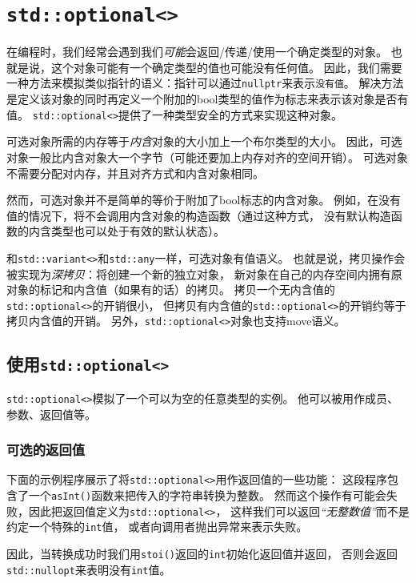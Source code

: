 \chapter{\texttt{std::optional<>}}\label{ch15}
在编程时，我们经常会遇到我们\emph{可能}会返回/传递/使用一个确定类型的对象。
也就是说，这个对象可能有一个确定类型的值也可能没有任何值。
因此，我们需要一种方法来模拟类似指针的语义：指针可以通过\texttt{nullptr}来表示\texttt{没有值}。
解决方法是定义该对象的同时再定义一个附加的bool类型的值作为标志来表示该对象是否有值。
\texttt{std::optional<>}提供了一种类型安全的方式来实现这种对象。

可选对象所需的内存等于\emph{内含}对象的大小加上一个布尔类型的大小。
因此，可选对象一般比内含对象大一个字节（可能还要加上内存对齐的空间开销）。
可选对象不需要分配对内存，并且对齐方式和内含对象相同。

然而，可选对象并不是简单的等价于附加了bool标志的内含对象。
例如，在没有值的情况下，将不会调用内含对象的构造函数（通过这种方式，
没有默认构造函数的内含类型也可以处于有效的默认状态）。

和\texttt{std::variant<>}和\texttt{std::any}一样，可选对象有值语义。
也就是说，拷贝操作会被实现为\emph{深拷贝}：将创建一个新的独立对象，
新对象在自己的内存空间内拥有原对象的标记和内含值（如果有的话）的拷贝。
拷贝一个无内含值的\texttt{std::optional<>}的开销很小，
但拷贝有内含值的\texttt{std::optional<>}的开销约等于拷贝内含值的开销。
另外，\texttt{std::optional<>}对象也支持move语义。


\section{使用\texttt{std::optional<>}}
\texttt{std::optional<>}模拟了一个可以为空的任意类型的实例。
他可以被用作成员、参数、返回值等。

\subsection{可选的返回值}\label{ch15.1.1}
下面的示例程序展示了将\texttt{std::optional<>}用作返回值的一些功能：
这段程序包含了一个\texttt{asInt()}函数来把传入的字符串转换为整数。
然而这个操作有可能会失败，因此把返回值定义为\texttt{std::optional<>}，
这样我们可以返回\emph{“无整数值”}而不是约定一个特殊的\texttt{int}值，
或者向调用者抛出异常来表示失败。

因此，当转换成功时我们用\texttt{stoi()}返回的\texttt{int}初始化返回值并返回，
否则会返回\texttt{std::nullopt}来表明没有\texttt{int}值。

